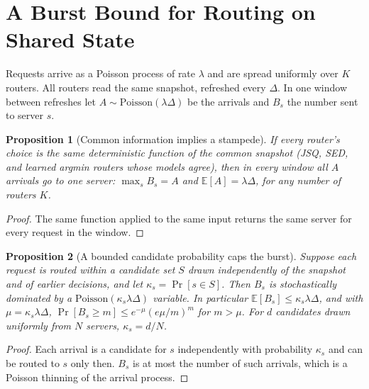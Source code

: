 \documentclass[10pt,twocolumn,letterpaper]{article}
\newtheorem{proposition}{Proposition}
\begin{document}
\section{A Burst Bound for Routing on Shared State}
\label{sec:theory}

Requests arrive as a Poisson process of rate $\lambda$ and are spread uniformly
over $K$ routers. All routers read the same snapshot, refreshed every $\Delta$.
In one window between refreshes let $A\sim\mathrm{Poisson}(\lambda\Delta)$ be the
arrivals and $B_s$ the number sent to server $s$.

\begin{proposition}[Common information implies a stampede]\label{prop:stampede}
If every router's choice is the same deterministic function of the common
snapshot (JSQ, SED, and learned argmin routers whose models agree), then in every
window all $A$ arrivals go to one server: $\max_s B_s=A$ and $\mathbb{E}[A]=\lambda\Delta$,
for any number of routers $K$.
\end{proposition}
\begin{proof}
The same function applied to the same input returns the same server for every
request in the window.
\end{proof}

\begin{proposition}[A bounded candidate probability caps the burst]\label{prop:cap}
Suppose each request is routed within a candidate set $S$ drawn independently of
the snapshot and of earlier decisions, and let $\kappa_s=\Pr[s\in S]$. Then
$B_s$ is stochastically dominated by a $\mathrm{Poisson}(\kappa_s\lambda\Delta)$
variable. In particular $\mathbb{E}[B_s]\le\kappa_s\lambda\Delta$, and with
$\mu=\kappa_s\lambda\Delta$, $\Pr[B_s\ge m]\le e^{-\mu}(e\mu/m)^m$ for $m>\mu$.
For $d$ candidates drawn uniformly from $N$ servers, $\kappa_s=d/N$.
\end{proposition}
\begin{proof}
Each arrival is a candidate for $s$ independently with probability $\kappa_s$ and
can be routed to $s$ only then. $B_s$ is at most the number of such arrivals,
which is a Poisson thinning of the arrival process.
\end{proof}
\end{document}
